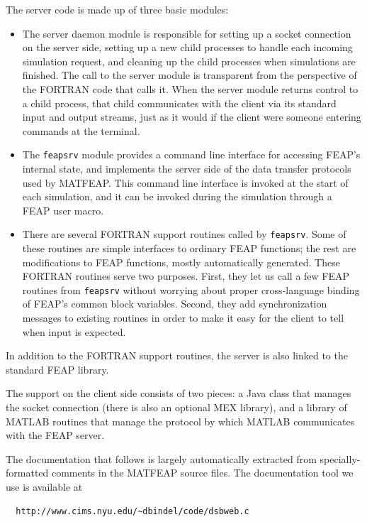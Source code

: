 \documentclass{report}
\begin{document}
The server code is made up of three basic modules:
\begin{itemize}
\item 
  The server daemon module is responsible for setting up a socket
  connection on the server side, setting up a new child processes to handle
  each incoming simulation request, and cleaning up the child processes
  when simulations are finished.  The call to the server module is transparent
  from the perspective of the FORTRAN code that calls it.  When the server
  module returns control to a child process, that child communicates with
  the client via its standard input and output streams, just as it would
  if the client were someone entering commands at the terminal.

\item
  The {\tt feapsrv} module provides a command line interface for accessing
  FEAP's internal state, and implements the server side of the data transfer
  protocols used by MATFEAP.  This command line interface is invoked at
  the start of each simulation, and it can be invoked during the simulation
  through a FEAP user macro.

\item
  There are several FORTRAN support routines called by {\tt feapsrv}.
  Some of these routines are simple interfaces to ordinary FEAP
  functions; the rest are modifications to FEAP functions, mostly
  automatically generated.  These FORTRAN routines serve two purposes.
  First, they let us call a few FEAP routines from {\tt feapsrv}
  without worrying about proper cross-language binding of FEAP's
  common block variables.  Second, they add synchronization messages
  to existing routines in order to make it easy for the client to tell
  when input is expected.

\end{itemize}

In addition to the FORTRAN support routines, the server is also linked to
the standard FEAP library.

The support on the client side consists of two pieces: a Java class
that manages the socket connection (there is also an optional MEX
library), and a library of MATLAB routines that manage the protocol by
which MATLAB communicates with the FEAP server.

The documentation that follows is largely automatically extracted from
specially-formatted comments in the MATFEAP source files.  The documentation
tool we use is available at
\begin{verbatim}
  http://www.cims.nyu.edu/~dbindel/code/dsbweb.c
\end{verbatim}
\end{document}
